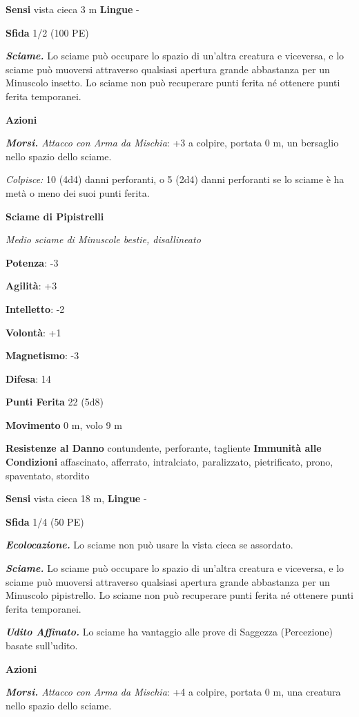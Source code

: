 \begin{multicols}{2}
\textbf{Sensi} vista cieca 3 m \textbf{Lingue} -

\textbf{Sfida} 1/2 (100 PE)

\emph{\textbf{Sciame.}} Lo sciame può occupare lo spazio di un'altra
creatura e viceversa, e lo sciame può muoversi attraverso qualsiasi
apertura grande abbastanza per un Minuscolo insetto. Lo sciame non può
recuperare punti ferita né ottenere punti ferita temporanei.

\textbf{Azioni}

\emph{\textbf{Morsi.} Attacco con Arma da Mischia}: +3 a colpire,
portata 0 m, un bersaglio nello spazio dello sciame.

\emph{Colpisce:} 10 (4d4) danni perforanti, o 5 (2d4) danni perforanti
se lo sciame è ha metà o meno dei suoi punti ferita.

\textbf{Sciame di Pipistrelli}

\emph{Medio sciame di Minuscole bestie, disallineato}

\textbf{Potenza}: -3

\textbf{Agilità}: +3

\textbf{Intelletto}: -2

\textbf{Volontà}: +1

\textbf{Magnetismo}: -3

\textbf{Difesa}: 14

\textbf{Punti Ferita} 22 (5d8)

\textbf{Movimento} 0 m, volo 9 m

\textbf{Resistenze al Danno} contundente, perforante, tagliente
\textbf{Immunità alle Condizioni} affascinato, afferrato, intralciato,
paralizzato, pietrificato, prono, spaventato, stordito

\textbf{Sensi} vista cieca 18 m,  \textbf{Lingue} -

\textbf{Sfida} 1/4 (50 PE)

\emph{\textbf{Ecolocazione.}} Lo sciame non può usare la vista cieca se
assordato.

\emph{\textbf{Sciame.}} Lo sciame può occupare lo spazio di un'altra
creatura e viceversa, e lo sciame può muoversi attraverso qualsiasi
apertura grande abbastanza per un Minuscolo pipistrello. Lo sciame non
può recuperare punti ferita né ottenere punti ferita temporanei.

\emph{\textbf{Udito Affinato.}} Lo sciame ha vantaggio alle prove di
Saggezza (Percezione) basate sull'udito.

\textbf{Azioni}

\emph{\textbf{Morsi.} Attacco con Arma da Mischia}: +4 a colpire,
portata 0 m, una creatura nello spazio dello sciame.


\end{multicols}
